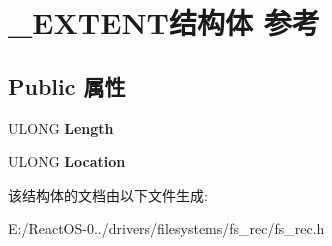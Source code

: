 \hypertarget{struct___e_x_t_e_n_t}{}\section{\+\_\+\+E\+X\+T\+E\+N\+T结构体 参考}
\label{struct___e_x_t_e_n_t}
\subsection*{Public 属性}
\begin{DoxyCompactItemize}
\item 
\mbox{\label{struct___e_x_t_e_n_t_a44230c99c952ba07fe7258bf7eebf5b5}} 
U\+L\+O\+NG {\bfseries Length}
\item 
\mbox{\label{struct___e_x_t_e_n_t_a03dc1e308aff9abb4ce20e6df2bcf767}} 
U\+L\+O\+NG {\bfseries Location}
\end{DoxyCompactItemize}


该结构体的文档由以下文件生成\+:\begin{DoxyCompactItemize}
\item 
E\+:/\+React\+O\+S-\/0../drivers/filesystems/fs\+\_\+rec/fs\+\_\+rec.\+h\end{DoxyCompactItemize}

